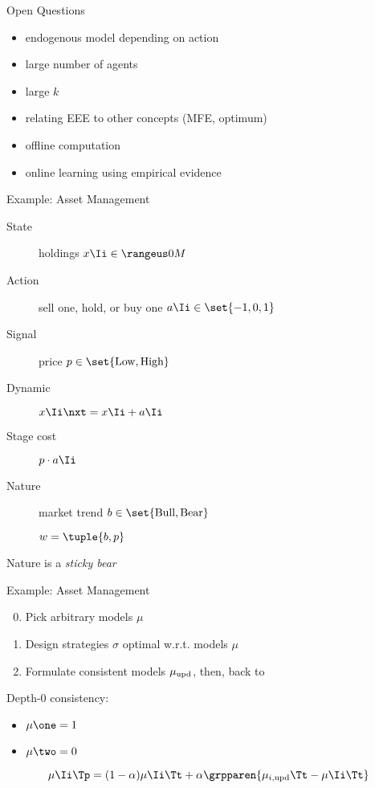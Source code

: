 \begin{frame}{Open Questions}
  \begin{itemize}
    \item \alert<2>{endogenous model depending on action}
    \item large number of agents
    \item large \(k\)
    \item \alert<3>{relating EEE to other concepts (MFE, optimum)}
    \item offline computation
    \item \alert<4>{online learning using empirical evidence}
  \end{itemize}
\end{frame}
\begin{frame}{Example: Asset Management}
  \begin{description}
    \item[State] holdings \(x\Ii \in \range{0}{M}\)
    \item[Action] sell one, hold, or buy one \(a\Ii \in \set{-1, 0, 1}\)
    \item[Signal] price \(p \in \set{\textnormal{Low}, \textnormal{High}}\)
    \item[Dynamic] \(x\Ii\nxt = x\Ii + a\Ii\)
    \item[Stage cost] \(p \cdot a\Ii\)
    \item[Nature] market trend \(b \in \set{\textnormal{Bull}, \textnormal{Bear}}\)

      \(w = \tuple{b, p}\)
  \end{description}

  Nature is a \emph{sticky bear}
\end{frame}
\begin{frame}{Example: Asset Management}
  \begin{enumerate}
    \setcounter{enumi}{-1}
    \item Pick arbitrary models \(\mu\)
    \item Design strategies \(\sigma\) optimal w.r.t. models \(\mu\)
    \item Formulate consistent models \(\mu_{\textnormal{upd}}\), then, back to 
  \end{enumerate}

  \bigskip
  Depth-\(0\) consistency:
  \begin{itemize}
    \item \(\mu\one = 1\)
    \item \(\mu\two = 0\)
  \end{itemize}

  \bigskip
  \[\mu\Ii\Tp = (1 - \alpha) \mu\Ii\Tt + \alpha \grpparen{\mu_{i,\textnormal{upd}}\Tt - \mu\Ii\Tt}\]
\end{frame}
